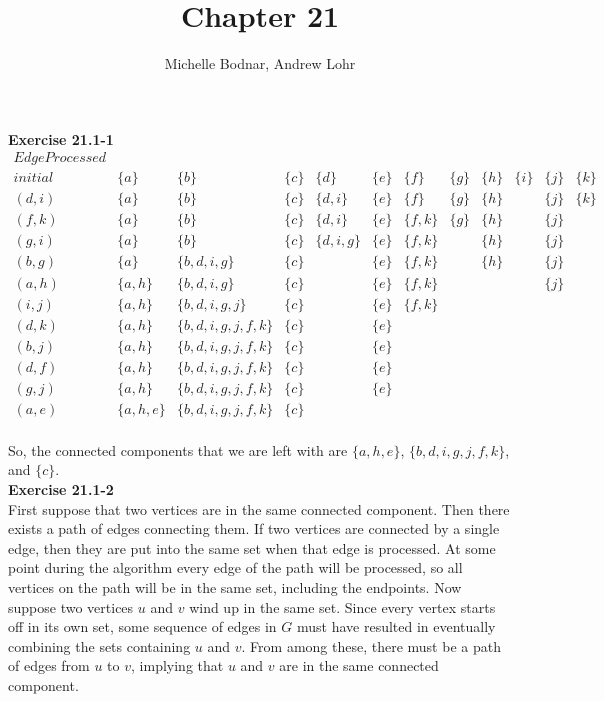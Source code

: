 \documentclass{article}
\title{Chapter 21}
\author{Michelle Bodnar, Andrew Lohr}
\begin{document}
\maketitle


\noindent\textbf{Exercise 21.1-1}\\

$
\begin{array}{c|ccccccccccc}
Edge Processed&&&&&&&&&&&\\
\hline
initial&\{a\}&\{b\}&\{c\}&\{d\}&\{e\}&\{f\}&\{g\}&\{h\}&\{i\}&\{j\}&\{k\}\\
(d,i)&\{a\}&\{b\}&\{c\}&\{d,i\}&\{e\}&\{f\}&\{g\}&\{h\}&&\{j\}&\{k\}\\
(f,k)&\{a\}&\{b\}&\{c\}&\{d,i\}&\{e\}&\{f,k\}&\{g\}&\{h\}&&\{j\}&\\
(g,i)&\{a\}&\{b\}&\{c\}&\{d,i,g\}&\{e\}&\{f,k\}&&\{h\}&&\{j\}&\\
(b,g)&\{a\}&\{b,d,i,g\}&\{c\}&&\{e\}&\{f,k\}&&\{h\}&&\{j\}&\\
(a,h)&\{a,h\}&\{b,d,i,g\}&\{c\}&&\{e\}&\{f,k\}&&&&\{j\}&\\
(i,j)&\{a,h\}&\{b,d,i,g,j\}&\{c\}&&\{e\}&\{f,k\}&&&&&\\
(d,k)&\{a,h\}&\{b,d,i,g,j,f,k\}&\{c\}&&\{e\}&&&&&&\\
(b,j)&\{a,h\}&\{b,d,i,g,j,f,k\}&\{c\}&&\{e\}&&&&&&\\
(d,f)&\{a,h\}&\{b,d,i,g,j,f,k\}&\{c\}&&\{e\}&&&&&&\\
(g,j)&\{a,h\}&\{b,d,i,g,j,f,k\}&\{c\}&&\{e\}&&&&&&\\
(a,e)&\{a,h,e\}&\{b,d,i,g,j,f,k\}&\{c\}&&&&&&&&\\
\end{array}
$

So, the connected components that we are left with are $\{a,h,e\}$, $\{b,d,i,g,j,f,k\}$, and $\{c\}$.\\

\noindent\textbf{Exercise 21.1-2}\\

First suppose that two vertices are in the same connected component.  Then there exists a path of edges connecting them.  If two vertices are connected by a single edge, then they are put into the same set when that edge is processed.  At some point during the algorithm every edge of the path will be processed, so all vertices on the path will be in the same set, including the endpoints. Now suppose two vertices $u$ and $v$ wind up in the same set.  Since every vertex starts off in its own set, some sequence of edges in $G$ must have resulted in eventually combining the sets containing $u$ and $v$.  From among these, there must be a path of edges from $u$ to $v$, implying that $u$ and $v$ are in the same connected component. \\
\end{document}
